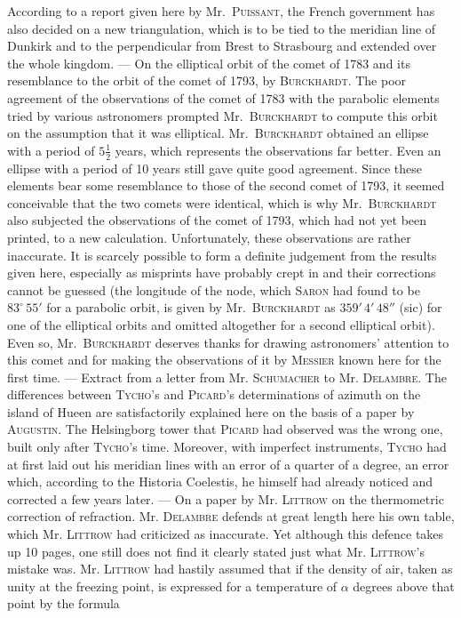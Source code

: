 According to a report given here by Mr.\ \textsc{Puissant}, the French government has also decided on a new triangulation, which is to be tied to the meridian line of Dunkirk and to the perpendicular from Brest to Strasbourg and extended over the whole kingdom. --- On the elliptical orbit of the comet of 1783 and its resemblance to the orbit of the comet of 1793, by \textsc{Burckhardt}. The poor agreement of the observations of the comet of 1783 with the parabolic elements tried by various astronomers prompted Mr.\ \textsc{Burckhardt} to compute this orbit on the assumption that it was elliptical. Mr.\ \textsc{Burckhardt} obtained an ellipse with a period of $5\tfrac{1}{2}$ years, which represents the observations far better. Even an ellipse with a period of 10 years still gave quite good agreement. Since these elements bear some resemblance to those of the second comet of 1793, it seemed conceivable that the two comets were identical, which is why Mr.\ \textsc{Burckhardt} also subjected the observations of the comet of 1793, which had not yet been printed, to a new calculation. Unfortunately, these observations are rather inaccurate. It is scarcely possible to form a definite judgement from the results given here, especially as misprints have probably crept in and their corrections cannot be guessed (the longitude of the node, which \textsc{Saron} had found to be $83^\circ\,55'$ for a parabolic orbit, is given by Mr.\ \textsc{Burckhardt} as $359'\,4'\,48''$ (sic) for one of the elliptical orbits and omitted altogether for a second elliptical orbit). Even so, Mr.\ \textsc{Burckhardt} deserves thanks for drawing astronomers’ attention to this comet and for making the observations of it by \textsc{Messier} known here for the first time. --- Extract from a letter from Mr. \textsc{Schumacher} to Mr. \textsc{Delambre}. The differences between \textsc{Tycho}'s and \textsc{Picard}'s determinations of azimuth on the island of Hueen are satisfactorily explained here on the basis of a paper by \textsc{Augustin}. The Helsingborg tower that \textsc{Picard} had observed was the wrong one, built only after \textsc{Tycho}'s time. Moreover, with imperfect instruments, \textsc{Tycho} had at first laid out his meridian lines with an error of a quarter of a degree, an error which, according to the Historia Coelestis, he himself had already noticed and corrected a few years later. --- On a paper by Mr. \textsc{Littrow} on the thermometric correction of refraction. Mr. \textsc{Delambre} defends at great length here his own table, which Mr. \textsc{Littrow} had criticized as inaccurate. Yet although this defence takes up 10 pages, one still does not find it clearly stated just what Mr. \textsc{Littrow}'s mistake was. Mr. \textsc{Littrow} had hastily assumed that if the density of air, taken as unity at the freezing point, is expressed for a temperature of $\alpha$ degrees above that point by the formula
